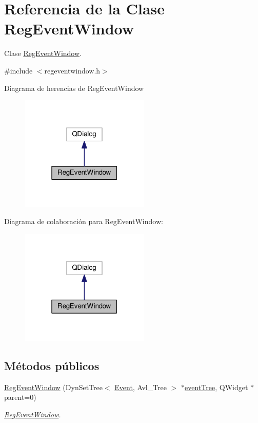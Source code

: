 \hypertarget{class_reg_event_window}{}\section{Referencia de la Clase Reg\+Event\+Window}
\label{class_reg_event_window}


Clase \hyperlink{class_reg_event_window}{Reg\+Event\+Window}.  




{\ttfamily \#include $<$regeventwindow.\+h$>$}



Diagrama de herencias de Reg\+Event\+Window\nopagebreak
\begin{figure}[H]
\begin{center}
\leavevmode
\includegraphics[width=175pt]{class_reg_event_window__inherit__graph}
\end{center}
\end{figure}


Diagrama de colaboración para Reg\+Event\+Window\+:\nopagebreak
\begin{figure}[H]
\begin{center}
\leavevmode
\includegraphics[width=175pt]{class_reg_event_window__coll__graph}
\end{center}
\end{figure}
\subsection*{Métodos públicos}
\begin{DoxyCompactItemize}
\item 
\hyperlink{class_reg_event_window_a27023c584958281b56c5a9f8143afecf}{Reg\+Event\+Window} (Dyn\+Set\+Tree$<$ \hyperlink{class_event}{Event}, Avl\+\_\+\+Tree $>$ $\ast$\hyperlink{class_reg_event_window_ab22b0d13f269a36935f27ae40244d4c4}{event\+Tree}, Q\+Widget $\ast$parent=0)
\begin{DoxyCompactList}\small\item\em \hyperlink{class_reg_event_window}{Reg\+Event\+Window}. \end{DoxyCompactList}\end{DoxyCompactItemize}
